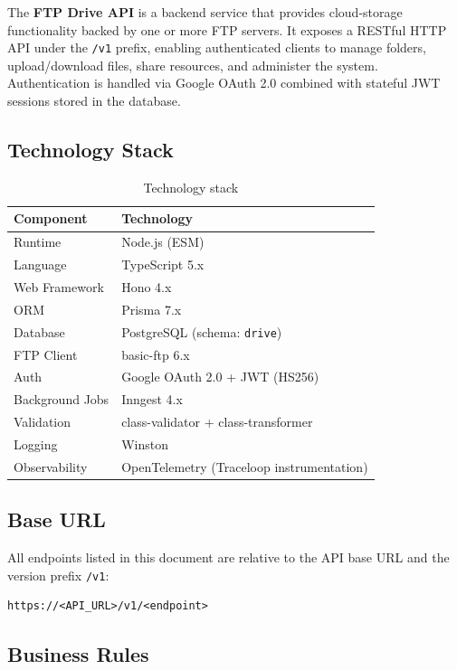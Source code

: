 \documentclass[12pt,a4paper]{article}
\begin{document}
The \textbf{FTP Drive API} is a backend service that provides cloud-storage functionality backed by one or more FTP servers. It exposes a RESTful HTTP API under the \texttt{/v1} prefix, enabling authenticated clients to manage folders, upload/download files, share resources, and administer the system. Authentication is handled via Google OAuth 2.0 combined with stateful JWT sessions stored in the database.

\subsection{Technology Stack}

\begin{table}[h!]
\centering
\begin{tabularx}{\linewidth}{lX}
\toprule
\textbf{Component} & \textbf{Technology} \\
\midrule
Runtime      & Node.js (ESM) \\
Language     & TypeScript 5.x \\
Web Framework & Hono 4.x \\
ORM          & Prisma 7.x \\
Database     & PostgreSQL (schema: \texttt{drive}) \\
FTP Client   & basic-ftp 6.x \\
Auth         & Google OAuth 2.0 + JWT (HS256) \\
Background Jobs & Inngest 4.x \\
Validation   & class-validator + class-transformer \\
Logging      & Winston \\
Observability & OpenTelemetry (Traceloop instrumentation) \\
\bottomrule
\end{tabularx}
\caption{Technology stack}
\end{table}

\subsection{Base URL}

All endpoints listed in this document are relative to the API base URL and the version prefix \texttt{/v1}:

\begin{lstlisting}
https://<API_URL>/v1/<endpoint>
\end{lstlisting}

\subsection{Business Rules}
\end{document}
